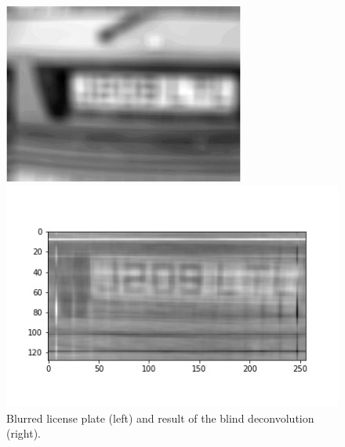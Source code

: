 \documentclass{article}
\begin{document}
\begin{figure}[ht]
    \centering
    \begin{minipage}{.45\textwidth}
        \includegraphics[width=\textwidth]{4-frank_wolfe/part2/blurredplate.jpg}
    \end{minipage}
    \begin{minipage}{.45\textwidth}
        \includegraphics[width=\textwidth]{4-frank_wolfe/part2/reconstruction.jpg}
    \end{minipage}
    \caption{Blurred license plate (left) and result of the blind deconvolution (right).}
    \label{fig:deconv}
\end{figure}
\end{document}

